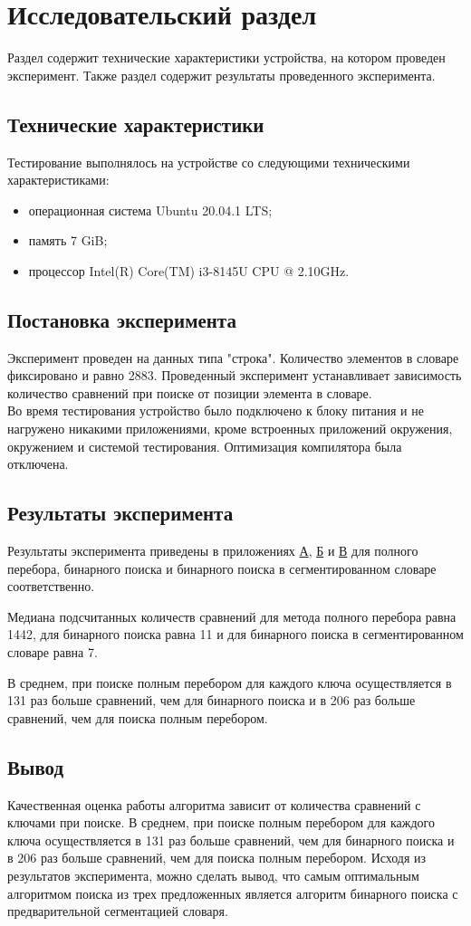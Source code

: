 \chapter{Исследовательский раздел}\label{sec:exp}
Раздел содержит технические характеристики устройства, на котором проведен эксперимент. Также раздел содержит результаты проведенного эксперимента.
\section{Технические характеристики}
Тестирование выполнялось на устройстве со следующими техническими характеристиками:
\begin{itemize}
	\item операционная система Ubuntu 20.04.1 LTS;
	\item память 7 GiB;
	\item процессор Intel(R) Core(TM) i3-8145U\cite{intel} CPU @ 2.10GHz.
\end{itemize}

\section{Постановка эксперимента}
Эксперимент проведен на данных типа "строка". Количество элементов в словаре фиксировано и равно 2883. Проведенный эксперимент устанавливает зависимость количество сравнений при поиске от позиции элемента в словаре.  \\
Во время тестирования устройство было подключено к блоку питания и не нагружено никакими приложениями, кроме встроенных приложений окружения, окружением и системой тестирования. Оптимизация компилятора была отключена.

\section{Результаты эксперимента}
Результаты эксперимента приведены в приложениях \hyperref[sec:brute]{А}, \hyperref[sec:bin]{Б} и \hyperref[sec:seg]{В} для полного перебора, бинарного поиска и бинарного поиска в сегментированном словаре соответственно.

Медиана подсчитанных количеств сравнений для метода полного перебора равна 1442, для бинарного поиска равна 11 и для бинарного поиска в сегментированном словаре равна 7. 

В среднем, при поиске полным перебором для каждого ключа осуществляется в 131 раз больше сравнений, чем для бинарного поиска и в 206 раз больше сравнений, чем для поиска полным перебором. 

\section{Вывод}\label{sec:exp-sum}
Качественная оценка работы алгоритма зависит от количества сравнений с ключами при поиске. В среднем, при поиске полным перебором для каждого ключа осуществляется в 131 раз больше сравнений, чем для бинарного поиска и в 206 раз больше сравнений, чем для поиска полным перебором. Исходя из результатов эксперимента, можно сделать вывод, что самым оптимальным алгоритмом поиска из трех предложенных является алгоритм бинарного поиска с предварительной сегментацией словаря.